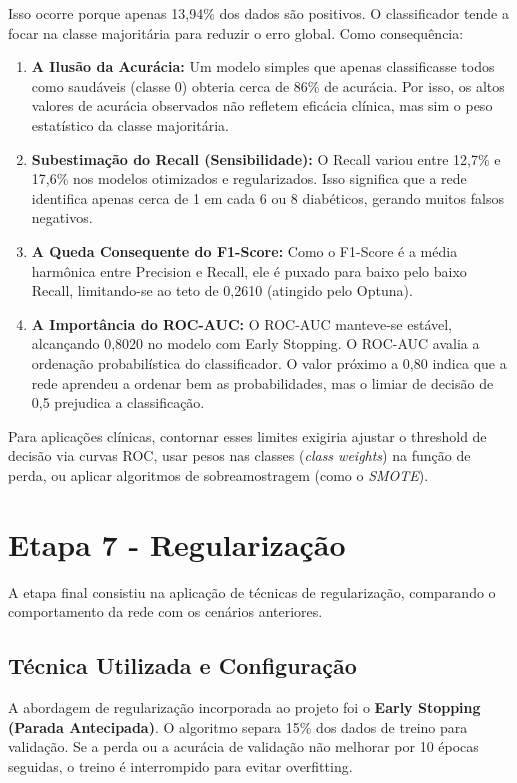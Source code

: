 \documentclass[12pt,a4paper]{article}
\begin{document}
Isso ocorre porque apenas 13,94\% dos dados são positivos. O classificador tende a focar na classe majoritária para reduzir o erro global. Como consequência:
\begin{enumerate}
    \item \textbf{A Ilusão da Acurácia:} Um modelo simples que apenas classificasse todos como saudáveis (classe 0) obteria cerca de 86\% de acurácia. Por isso, os altos valores de acurácia observados não refletem eficácia clínica, mas sim o peso estatístico da classe majoritária.
    \item \textbf{Subestimação do Recall (Sensibilidade):} O Recall variou entre 12,7\% e 17,6\% nos modelos otimizados e regularizados. Isso significa que a rede identifica apenas cerca de 1 em cada 6 ou 8 diabéticos, gerando muitos falsos negativos.
    \item \textbf{A Queda Consequente do F1-Score:} Como o F1-Score é a média harmônica entre Precision e Recall, ele é puxado para baixo pelo baixo Recall, limitando-se ao teto de 0,2610 (atingido pelo Optuna).
    \item \textbf{A Importância do ROC-AUC:} O ROC-AUC manteve-se estável, alcançando 0,8020 no modelo com Early Stopping. O ROC-AUC avalia a ordenação probabilística do classificador. O valor próximo a 0,80 indica que a rede aprendeu a ordenar bem as probabilidades, mas o limiar de decisão de 0,5 prejudica a classificação.
\end{enumerate}

Para aplicações clínicas, contornar esses limites exigiria ajustar o threshold de decisão via curvas ROC, usar pesos nas classes (\textit{class weights}) na função de perda, ou aplicar algoritmos de sobreamostragem (como o \textit{SMOTE}).

\section{Etapa 7 - Regularização}
A etapa final consistiu na aplicação de técnicas de regularização, comparando o comportamento da rede com os cenários anteriores.

\subsection{Técnica Utilizada e Configuração}
A abordagem de regularização incorporada ao projeto foi o \textbf{Early Stopping (Parada Antecipada)}. O algoritmo separa 15\% dos dados de treino para validação. Se a perda ou a acurácia de validação não melhorar por 10 épocas seguidas, o treino é interrompido para evitar overfitting.
\end{document}
